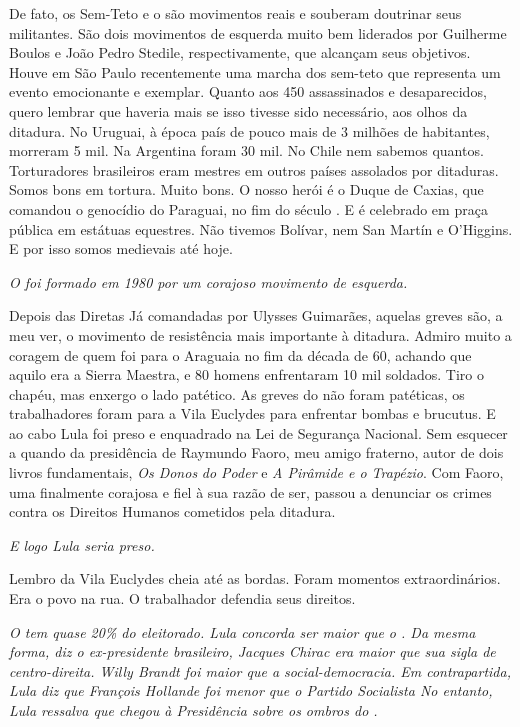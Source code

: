 \normalfont
De fato, os Sem-Teto e o  são movimentos reais e
souberam doutrinar seus militantes. São dois movimentos de esquerda
muito bem liderados por Guilherme Boulos e João Pedro Stedile,
respectivamente, que alcançam seus objetivos. Houve em São Paulo
recentemente uma marcha dos sem-teto que representa um evento
emocionante e exemplar. Quanto aos 450 assassinados e desaparecidos,
quero lembrar que haveria mais se isso tivesse sido necessário, aos
olhos da ditadura. No Uruguai, à época país de pouco mais de 3 milhões
de habitantes, morreram 5 mil. Na Argentina foram 30 mil. No Chile nem
sabemos quantos. Torturadores brasileiros eram mestres em outros países
assolados por ditaduras. Somos bons em tortura. Muito bons. O nosso
herói é o Duque de Caxias, que comandou o genocídio do Paraguai, no fim
do século . E é celebrado em praça pública em estátuas equestres. Não
tivemos Bolívar, nem San Martín e O'Higgins. E por isso somos medievais
até hoje.

\itshape
 O  foi formado em 1980 por um corajoso movimento de
esquerda.

\normalfont
Depois das Diretas Já comandadas por Ulysses Guimarães,
aquelas greves são, a meu ver, o movimento de resistência mais
importante à ditadura. Admiro muito a coragem de quem foi para o
Araguaia no fim da década de 60, achando que aquilo era a Sierra
Maestra, e 80 homens enfrentaram 10 mil soldados. Tiro o chapéu, mas
enxergo o lado patético. As greves do  não foram patéticas, os
trabalhadores foram para a Vila Euclydes para enfrentar bombas e
brucutus. E ao cabo Lula foi preso e enquadrado na Lei de Segurança
Nacional. Sem esquecer a  quando da presidência de Raymundo Faoro,
meu amigo fraterno, autor de dois livros fundamentais, \emph{Os Donos}
\emph{do Poder} e \emph{A Pirâmide e o Trapézio}. Com Faoro, uma 
finalmente corajosa e fiel à sua razão de ser, passou a denunciar os
crimes contra os Direitos Humanos cometidos pela ditadura.

\itshape
 E logo Lula seria preso.

\normalfont
Lembro da Vila Euclydes cheia até as bordas. Foram
momentos extraordinários. Era o povo na rua. O trabalhador defendia seus
direitos.

\itshape
 O  tem quase 20\% do eleitorado. Lula concorda ser
maior que o . Da mesma forma, diz o ex-presidente brasileiro, Jacques
Chirac era maior que sua sigla de centro-direita. Willy Brandt foi maior
que a social-democracia. Em contrapartida, Lula diz que François
Hollande foi menor que o Partido Socialista No entanto, Lula ressalva
que chegou à Presidência sobre os ombros do .

